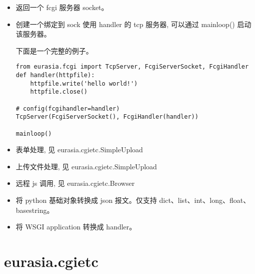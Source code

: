 \documentclass{manual}
\begin{document}
\begin{itemize}
\item {}

返回一个 fcgi 服务器 socket。

\item {}

创建一个绑定到 sock 使用 handler 的 tcp 服务器, 可以通过 mainloop() 启动该服务器。

下面是一个完整的例子。

\begin{verbatim}
from eurasia.fcgi import TcpServer, FcgiServerSocket, FcgiHandler
def handler(httpfile):
	httpfile.write('hello world!')
	httpfile.close()

# config(fcgihandler=handler)
TcpServer(FcgiServerSocket(), FcgiHandler(handler))

mainloop()
\end{verbatim}

\item {}

表单处理, 见 eurasia.cgietc.SimpleUpload

\item {}

上传文件处理, 见 eurasia.cgietc.SimpleUpload

\item {}

远程 js 调用, 见 eurasia.cgietc.Browser

\item {}

将 python 基础对象转换成 json 报文。仅支持 dict、list、int、long、float、basestring。


\item {}

将 WSGI application 转换成 handler。

\end{itemize}

\section{eurasia.cgietc}
\end{document}
